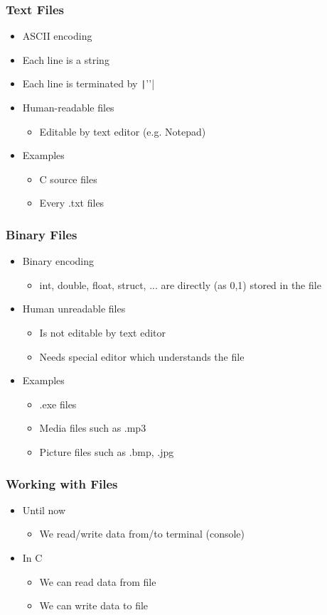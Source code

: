 \documentclass{../c-lecture}
\begin{document}
\begin{frame}[fragile]
  \frametitle{Text Files}
  \begin{itemize}
    \item ASCII encoding
    \item Each line is a string
    \item Each line is terminated by \texttt|'\n'|
    \item Human-readable files
    \begin{itemize}
      \item Editable by text editor (e.g. Notepad)
    \end{itemize}
    \item Examples
    \begin{itemize}
      \item C source files
      \item Every .txt files
    \end{itemize}
  \end{itemize}
\end{frame}
\begin{frame}
  \frametitle{Binary Files}
  \begin{itemize}
    \item Binary encoding
    \begin{itemize}
      \item
        int, double, float, struct, ... are directly (as 0,1) stored in the file

    \end{itemize}
    \item Human unreadable files
    \begin{itemize}
      \item Is not editable by text editor
      \item Needs special editor which understands the file
    \end{itemize}
    \item Examples
    \begin{itemize}
      \item .exe files
      \item Media files such as .mp3
      \item Picture files such as .bmp, .jpg
    \end{itemize}
  \end{itemize}
\end{frame}
\begin{frame}
  \frametitle{Working with Files}
  \begin{itemize}
    \item Until now
    \begin{itemize}
      \item We read/write data from/to terminal (console)
    \end{itemize}
    \item In C
    \begin{itemize}
      \item We can read data from file
      \item We can write data to file
    \end{itemize}
  \end{itemize}
\end{frame}
\end{document}
